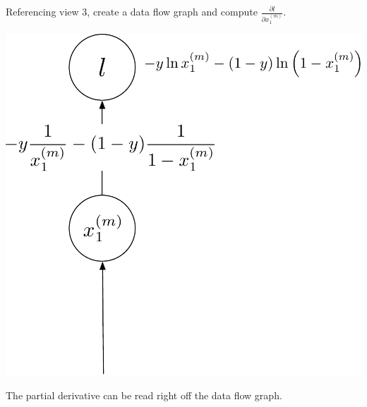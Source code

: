 \documentclass[assignment06_Solutions]{subfiles}
\begin{document}
\begin{exercise}[(75 minutes)]
\item Referencing view 3, create a data flow graph and compute $\frac{\partial l}{\partial x^{(m)}_1}$.
\begin{boxedsolution}
\begin{center}
\includegraphics[width=0.5\linewidth]{figures/5asolution}
\end{center}
The partial derivative can be read right off the data flow graph.
\end{boxedsolution}

\ees
\end{exercise}
\end{document}
